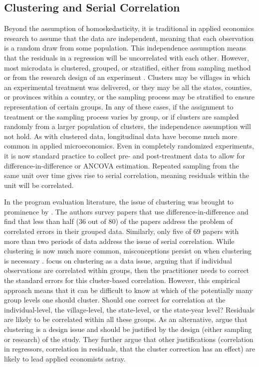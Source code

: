 \documentclass[11pt]{article}
\begin{document}
\subsection{Clustering and Serial Correlation}

Beyond the assumption of homoskedasticity, it is traditional in applied economics research to assume that the data are independent, meaning that each observation is a random draw from some population. This independence assumption means that the residuals in a regression will be uncorrelated with each other. However, most microdata is clustered, grouped, or stratified, either from sampling method or from the research design of an experiment \citep{abadie_samplingbased_2020}. Clusters may be villages in which an experimental treatment was delivered, or they may be all the states, counties, or provinces within a country, or the sampling process may be stratified to ensure representation of certain groups. In any of these cases, if the assignment to treatment or the sampling process varies by group, or if clusters are sampled randomly from a larger population of clusters, the independence assumption will not hold. As with clustered data, longitudinal data have become much more common in applied microeconomics. Even in completely randomized experiments, it is now standard practice to collect pre- and post-treatment data to allow for difference-in-difference or ANCOVA estimation. Repeated sampling from the same unit over time gives rise to serial correlation, meaning residuals within the unit will be correlated.

In the program evaluation literature, the issue of clustering was brought to prominence by \cite{bertrand_how_2004}. The authors survey papers that use difference-in-difference and find that less than half (36 out of 80) of the papers address the problem of correlated errors in their grouped data. Similarly, only five of 69 papers with more than two periods of data address the issue of serial correlation. While clustering is now much more common, misconceptions persist on when clustering is necessary \citep{abadie_when_2017}. \cite{cameron_practitioners_2015} focus on clustering as a data issue, arguing that if individual observations are correlated within groups, then the practitioner needs to correct the standard errors for this cluster-based correlation. However, this empirical approach means that it can be difficult to know at which of the potentially many group levels one should cluster. Should one correct for correlation at the individual-level, the village-level, the state-level, or the state-year level? Residuals are likely to be correlated within all these groups. As an alternative, \cite{abadie_when_2017} argue that clustering is a design issue and should be justified by the design (either sampling or research) of the study. They further argue that other justifications (correlation in regressors, correlation in residuals, that the cluster correction has an effect) are likely to lead applied economists astray.
\end{document}
